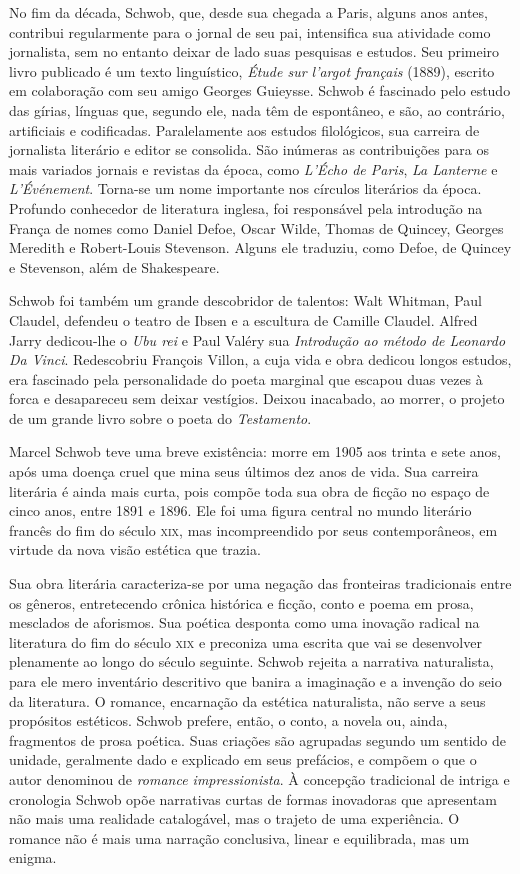 No fim da década, Schwob, que, desde sua chegada a Paris, alguns anos antes,
contribui regularmente para o jornal de seu pai, intensifica sua atividade como
jornalista, sem no entanto deixar de lado suas pesquisas e estudos. Seu
primeiro livro publicado é um texto linguístico, \textit{Étude sur l’argot
français} (1889), escrito em colaboração com seu amigo Georges Guieysse. Schwob
é fascinado pelo estudo das gírias, línguas que, segundo ele, nada têm de
espontâneo, e são, ao contrário, artificiais e codificadas. Paralelamente aos
estudos filológicos, sua carreira de jornalista literário e editor se
consolida. São inúmeras as contribuições para os mais variados jornais e
revistas da época, como \textit{L’Écho de Paris}, \textit{La Lanterne} e
\textit{L’Événement}. Torna-se um nome importante nos círculos literários da
época. Profundo conhecedor de literatura inglesa, foi responsável pela
introdução na França de nomes como Daniel Defoe, Oscar Wilde, Thomas de
Quincey, Georges Meredith e Robert-Louis Stevenson. Alguns ele traduziu, como
Defoe, de Quincey e Stevenson, além de Shakespeare.

Schwob foi também um grande descobridor de talentos: Walt Whitman, Paul
Claudel, defendeu o teatro de Ibsen e a escultura de Camille Claudel. Alfred
Jarry dedicou-lhe o \textit{Ubu rei} e Paul Valéry sua \textit{Introdução ao
método de Leonardo Da Vinci}. Redescobriu François Villon, a cuja vida e obra
dedicou longos estudos, era fascinado pela personalidade do poeta marginal que
escapou duas vezes à forca e desapareceu sem deixar vestígios. Deixou
inacabado, ao morrer, o projeto de um grande livro sobre o poeta do
\textit{Testamento}.

Marcel Schwob teve uma breve existência: morre em 1905 aos trinta e sete
anos, após uma doença cruel que mina seus últimos dez anos de vida. Sua
carreira literária é ainda mais curta, pois compõe toda sua obra de ficção no
espaço de cinco anos, entre 1891 e 1896. Ele foi uma figura central no mundo
literário francês do fim do século \textsc{xix}, mas incompreendido por seus
contemporâneos, em virtude da nova visão estética que trazia.

Sua obra literária caracteriza-se por uma negação das fronteiras
tradicionais entre os gêneros, entretecendo crônica histórica e ficção, conto e
poema em prosa, mesclados de aforismos. Sua poética desponta como uma inovação
radical na literatura do fim do século \textsc{xix} e preconiza uma escrita que vai se
desenvolver plenamente ao longo do século seguinte. Schwob rejeita a narrativa
naturalista, para ele mero inventário descritivo que banira a imaginação e a
invenção do seio da literatura. O romance, encarnação da estética naturalista,
não serve a seus propósitos estéticos. Schwob prefere, então, o conto, a novela
ou, ainda, fragmentos de prosa poética. Suas criações são agrupadas segundo um
sentido de unidade, geralmente dado e explicado em seus prefácios, e compõem o
que o autor denominou de \textit{romance impressionista}. À concepção
tradicional de intriga e cronologia Schwob opõe narrativas curtas de formas
inovadoras que apresentam não mais uma realidade catalogável, mas o trajeto de
uma experiência. O romance não é mais uma narração conclusiva, linear e
equilibrada, mas um enigma.

